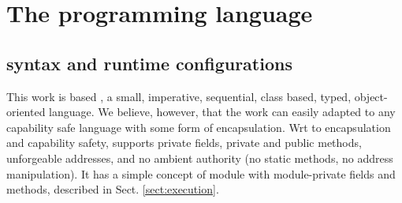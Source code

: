 \section{The programming language \LangOO}  
\label{sect:underlying}

\subsection{\LangOO syntax and runtime configurations}
\label{sub:Loo} 
{This work} is based \LangOO, a {small}, imperative, sequential,  class based, typed, object-oriented language. 
 {We believe, however, that the work can easily adapted to any capability safe language with some form of encapsulation. 
Wrt to encapsulation and  capability safety},  \LangOO supports private fields, private and public methods, unforgeable addresses, and no ambient authority (no static methods, no address manipulation).
 It has a simple concept of module with module-private fields and methods, described in Sect. \ref{sect:execution}.
